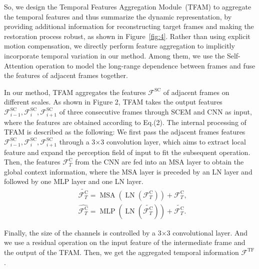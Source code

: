 \documentclass[journal]{IEEEtran}
\begin{document}
So, we design the Temporal Features Aggregation Module~(TFAM) to aggregate the temporal features and thus summarize the dynamic representation, by providing additional information for reconstructing target frames and making the restoration process robust, as shown in Figure~\ref{fig:4}. Rather than using explicit motion compensation, we directly perform feature aggregation to implicitly incorporate temporal variation in our method. Among them, we use the Self-Attention operation to model the long-range dependence between frames and fuse the features of adjacent frames together.

In our method, TFAM aggregates the features $\mathcal{F}^\text{SC}$ of adjacent frames on different scales. As shown in Figure 2, TFAM takes the output features $\mathcal{F}_ {i-1}^\text{SC}, \mathcal{F}_{i}^\text{SC}, \mathcal{F}_{i+1}^\text{SC}$ of three consecutive frames through SCEM and CNN as input, where the features are obtained according to Eq.(2). 
The internal processing of TFAM is described as the following:  We first pass the adjacent frames features $\mathcal{F}_ {i-1}^\text{SC}, \mathcal{F}_{i}^\text{SC}, \mathcal{F}_{i+1}^\text{SC}$ through a 3$\times$3 convolution layer, which aims to extract local feature and expand the perception field of input to fit the subsequent operation.
Then, the features $\mathcal{F}_{T}^{\text{C}}$ from the CNN are fed into an MSA layer to obtain the global context information, where the MSA layer is preceded by an LN layer and followed by one MLP layer and one LN layer. 
\begin{equation}
\begin{aligned}
&\tilde{\mathcal{F}_{T}^{\text {C}}}=\operatorname{MSA}(\operatorname{LN}( \mathcal{F}_{T}^{\text {C}}))+ \mathcal{F}_{T}^{\text {C}}, \\
&\hat{\mathcal{F}_{T}^{\text {C}}}=\operatorname{MLP}(\operatorname{LN}( \tilde{\mathcal{F}_{T}^{\text {C}}}))+ \tilde{\mathcal{F}_{T}^{\text {C}}}.
\end{aligned}
\end{equation}

Finally, the size of the channels is controlled by a 3$\times$3 convolutional layer.
And we use a residual operation on the input feature of the intermediate frame and the output of the TFAM. Then, we get the aggregated temporal information $\mathcal{F}^{\text {TF}}$. 
\end{document}
